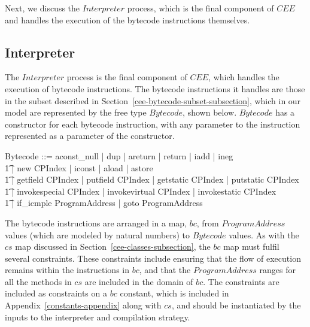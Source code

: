 Next, we discuss the $Interpreter$ process, which is the final
component of $CEE$ and handles the execution of the bytecode
instructions themselves.

\subsection{Interpreter}
\label{cee-interpreter-subsection}

The $Interpreter$ process is the final component of $CEE$, which
handles the execution of bytecode instructions.
The bytecode instructions it handles are those in the subset described
in Section~\ref{cee-bytecode-subset-subsection}, which in our model
are represented by the free type $Bytecode$, shown below.
$Bytecode$ has a constructor for each bytecode instruction, with any
parameter to the instruction represented as a parameter of the
constructor.
\begin{zed}
  Bytecode ::= aconst\_null | dup | areturn | return | iadd | ineg \\
  \t1 | new \ldata CPIndex \rdata | iconst \ldata \nat \rdata | aload \ldata \nat \rdata | astore \ldata \nat \rdata \\
  \t1 | getfield \ldata CPIndex \rdata | putfield \ldata CPIndex \rdata | getstatic \ldata CPIndex \rdata | putstatic \ldata CPIndex \rdata \\
  \t1 | invokespecial \ldata CPIndex \rdata | invokevirtual \ldata CPIndex \rdata | invokestatic \ldata CPIndex \rdata \\
  \t1 | if\_icmple \ldata ProgramAddress \rdata | goto \ldata ProgramAddress \rdata
\end{zed}
The bytecode instructions are arranged in a map, $bc$, from
$ProgramAddress$ values (which are modeled by natural numbers) to
$Bytecode$ values.
As with the $cs$ map discussed in
Section~\ref{cee-classes-subsection}, the $bc$ map must fulfil several
constraints.
These constraints include ensuring that the flow of execution remains
within the instructions in $bc$, and that the $ProgramAddress$ ranges
for all the methods in $cs$ are included in the domain of $bc$.
The constraints are included as constraints on a $bc$ constant, which
is included in Appendix~\ref{constants-appendix} along with $cs$, and
should be instantiated by the inputs to the interpreter and
compilation strategy.

